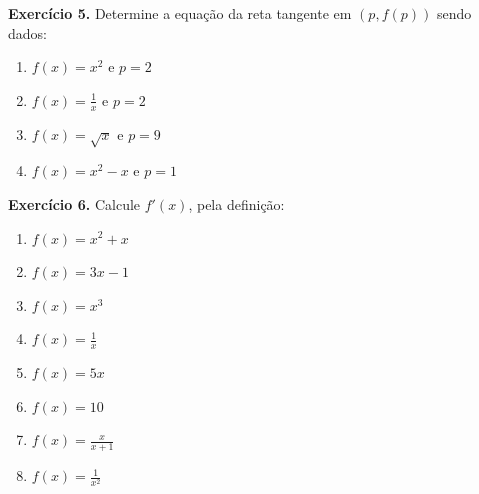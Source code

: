 \documentclass[12pt,a4paper]{article}
\begin{document}
\vspace{0.8cm}
\noindent\textbf{Exercício 5.} Determine a equação da reta tangente em $(p, f(p))$ sendo dados:

\begin{enumerate}
    \renewcommand{\theenumi}{\alph{enumi}}
    \renewcommand{\labelenumi}{\theenumi)}
    \item $f(x) = x^2$ e $p = 2$
    \item $f(x) = \frac{1}{x}$ e $p = 2$
    \item $f(x) = \sqrt{x}$ e $p = 9$
    \item $f(x) = x^2 - x$ e $p = 1$
\end{enumerate}


\vspace{0.8cm}
\noindent\textbf{Exercício 6.} Calcule $f'(x)$, pela definição:

\begin{enumerate}
    \renewcommand{\theenumi}{\alph{enumi}}
    \renewcommand{\labelenumi}{\theenumi)}
    \item $f(x) = x^2 + x$
    \item $f(x) = 3x - 1$
    \item $f(x) = x^3$
    \item $f(x) = \frac{1}{x}$
    \item $f(x) = 5x$
    \item $f(x) = 10$
    \item $f(x) = \frac{x}{x + 1}$
    \item $f(x) = \frac{1}{x^2}$
\end{enumerate}
\end{document}
